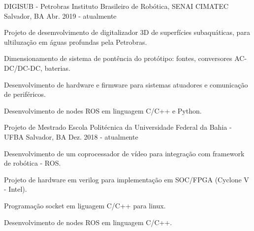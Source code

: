 

\begin{cventries}

  \cventry
    {DIGISUB - Petrobras} %
    {Instituto Brasileiro de Robótica, SENAI CIMATEC} %
    {Salvador, BA} %
    {Abr. 2019 - atualmente} %
    {
      \begin{cvitems} %
        \item {Projeto de desemvolvimento de digitalizador 3D de superfícies subaquáticas, para ultiluzação em águas profundas pela Petrobras.}
        \item {Dimensionamento de sistema de pontência do protótipo: fontes, conversores AC-DC/DC-DC, baterias.}
        \item {Desenvolvimento de hardware e firmware para sistemas atuadores e comunicação de periféricos.}
        \item {Desenvolvimento de nodes ROS em linguagem C/C++ e Python.}
      \end{cvitems}
    }


  \cventry
    {Projeto de Mestrado} %
    {Escola Politécnica da Universidade Federal da Bahia - UFBA} %
    {Salvador, BA} %
    {Dez. 2018 - atualmente} %
    {
      \begin{cvitems} %
        \item {Desenvolvimento de um coprocessador de vídeo para integração com framework de robótica - ROS.}
        \item {Projeto de hardware em verilog para implementação em SOC/FPGA (Cyclone V - Intel).}
        \item {Programação socket em liguagem C/C++ para linux.}
        \item {Desenvolvimento de nodes ROS em linguagem C/C++.}
      \end{cvitems}
    }


\end{cventries}

